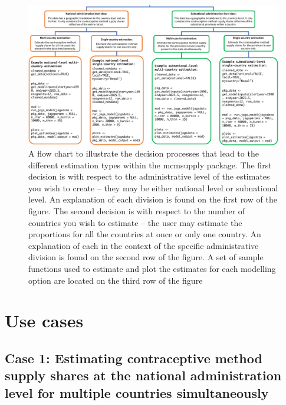 \begin{figure}[H]
\includegraphics[width=1\linewidth,height=0.35\textheight]{figures/fig_2} \caption{A flow chart to illustrate the decision processes that lead to the different estimation types within the mcmsupply package. The first decision is with respect to the administrative level of the estimates you wish to create – they may be either national level or subnational level. An explanation of each division is found on the first row of the figure. The second decision is with respect to the number of countries you wish to estimate – the user may estimate the proportions for all the countries at once or only one country. An explanation of each in the context of the specific administrative division is found on the second row of the figure. A set of sample functions used to estimate and plot the estimates for each modelling option are located on the third row of the figure}\label{fig:fig-2}
\end{figure}

\hypertarget{use-cases}{%
\section{Use cases}\label{use-cases}}

\hypertarget{case-1-estimating-contraceptive-method-supply-shares-at-the-national-administration-level-for-multiple-countries-simultaneously}{%
\subsection{Case 1: Estimating contraceptive method supply shares at the national administration level for multiple countries simultaneously}\label{case-1-estimating-contraceptive-method-supply-shares-at-the-national-administration-level-for-multiple-countries-simultaneously}}

